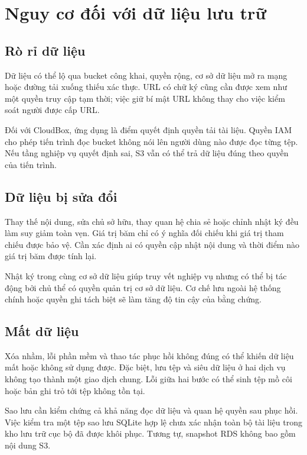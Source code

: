\section{Nguy cơ đối với dữ liệu lưu trữ}
\subsection{Rò rỉ dữ liệu}
Dữ liệu có thể lộ qua bucket công khai, quyền rộng, cơ sở dữ liệu mở ra mạng hoặc đường tải xuống thiếu xác thực. URL có chữ ký cũng cần được xem như một quyền truy cập tạm thời; việc giữ bí mật URL không thay cho việc kiểm soát người được cấp URL.

Đối với CloudBox, ứng dụng là điểm quyết định quyền tải tài liệu. Quyền IAM cho phép tiến trình đọc bucket không nói lên người dùng nào được đọc từng tệp. Nếu tầng nghiệp vụ quyết định sai, S3 vẫn có thể trả dữ liệu đúng theo quyền của tiến trình.
\subsection{Dữ liệu bị sửa đổi}
Thay thế nội dung, sửa chủ sở hữu, thay quan hệ chia sẻ hoặc chỉnh nhật ký đều làm suy giảm toàn vẹn. Giá trị băm chỉ có ý nghĩa đối chiếu khi giá trị tham chiếu được bảo vệ. Cần xác định ai có quyền cập nhật nội dung và thời điểm nào giá trị băm được tính lại.

Nhật ký trong cùng cơ sở dữ liệu giúp truy vết nghiệp vụ nhưng có thể bị tác động bởi chủ thể có quyền quản trị cơ sở dữ liệu. Cơ chế lưu ngoài hệ thống chính hoặc quyền ghi tách biệt sẽ làm tăng độ tin cậy của bằng chứng.
\subsection{Mất dữ liệu}
Xóa nhầm, lỗi phần mềm và thao tác phục hồi không đúng có thể khiến dữ liệu mất hoặc không sử dụng được. Đặc biệt, lưu tệp và siêu dữ liệu ở hai dịch vụ không tạo thành một giao dịch chung. Lỗi giữa hai bước có thể sinh tệp mồ côi hoặc bản ghi trỏ tới tệp không tồn tại.

Sao lưu cần kiểm chứng cả khả năng đọc dữ liệu và quan hệ quyền sau phục hồi. Việc kiểm tra một tệp sao lưu SQLite hợp lệ chưa xác nhận toàn bộ tài liệu trong kho lưu trữ cục bộ đã được khôi phục. Tương tự, snapshot RDS không bao gồm nội dung S3.
